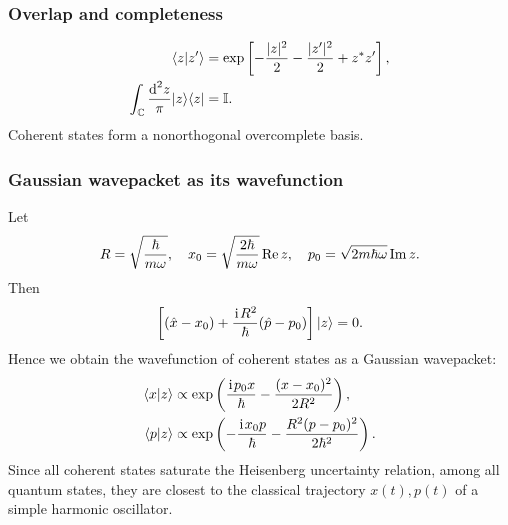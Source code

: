 \subsubsection{Overlap and completeness}
\begin{align}
\langle{z|z'}\rangle
&=\exp\left[-\frac{|z|^2}{2}-\frac{|z'|^2}{2}+z^*z'\right],\\
\int_{\mathbb C}\frac{\text{d}^2z}{\pi}|z\rangle\langle z|&=\mathbb{I}.
\end{align}
Coherent states form a nonorthogonal overcomplete basis.

\subsubsection{Gaussian wavepacket as its wavefunction}
Let
\begin{equation}
R=\sqrt{\frac{\hbar}{m\omega}},
\quad
x_0=\sqrt{\frac{2\hbar}{m\omega}}\operatorname{Re} z,
\quad
p_0=\sqrt{2m\hbar\omega}\operatorname{Im} z.
\end{equation}
Then
\begin{equation}
\left[(\hat x-x_0)+\frac{\hspace{1pt}\mathrm{i}\hspace{1pt} R^2}{\hbar}(\hat p-p_0)\right]
|{z}\rangle=0.
\end{equation}
Hence we obtain the wavefunction of coherent states as a Gaussian wavepacket:
\begin{align}
\langle{x|z}\rangle&\propto
\exp\left(\frac{\hspace{1pt}\mathrm{i}\hspace{1pt} p_0x}{\hbar}
-\frac{(x-x_0)^2}{2R^2}\right),\\
\langle{p|z}\rangle&\propto
\exp\left(-\frac{\hspace{1pt}\mathrm{i}\hspace{1pt} x_0p}{\hbar}
-\frac{R^2(p-p_0)^2}{2\hbar^2}\right).
\end{align}
Since all coherent states saturate the Heisenberg uncertainty relation, among all quantum states, they are closest to the classical trajectory $x(t),p(t)$ of a simple harmonic oscillator. 